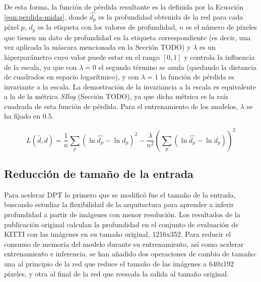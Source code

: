 De esta forma, la función de pérdida resultante es la definida por la Ecuación \ref{eqn:perdida-midas}, donde $\hat{d_p}$ es la profundidad obtenida de la red para cada píxel $p$, $d_p$ es la etiqueta con los valores de profundidad, $n$ es el número de píxeles que tienen un dato de profundidad en la etiqueta correspondiente (es decir, una vez aplicada la máscara mencionada en la Sección TODO) y $\lambda$ es un hiperparámetro cuyo valor puede estar en el rango $[0, 1]$ y controla la influencia de la escala, ya que con $\lambda=0$ el segundo término se anula (quedando la distancia de cuadrados en espacio logarítmico), y con $\lambda=1$ la función de pérdida es invariante a la escala. La demostración de la invariancia a la escala es equivalente a la de la métrica \textit{SIlog} (Sección TODO), ya que dicha métrica es la raíz cuadrada de esta función de pérdida. Para el entrenamiento de los modelos, $\lambda$ se ha fijado en $0.5$.

\begin{equation}
\label{eqn:perdida-midas}
L(\hat{d}, d) = \frac{1}{n}\sum_{p} (\ln{\hat{d_p}} - \ln{d_p})^2 - \frac{\lambda}{n^2} \left( \sum_{p} (\ln{\hat{d_p}} - \ln{d_p}) \right)^2
\end{equation}

\subsection{Reducción de tamaño de la entrada}
Para acelerar DPT lo primero que se modificó fue el tamaño de la entrada, buscando estudiar la flexibilidad de la arquitectura para aprender a inferir profundidad a partir de imágenes con menor resolución. Los resultados de la publicación original calculan la profundidad en el conjunto de evaluación de KITTI con las imágenes en su tamaño original, 1216x352. Para reducir el consumo de memoria del modelo durante su entrenamiento, así como acelerar entrenamiento e inferencia, se han añadido dos operaciones de cambio de tamaño: una al principio de la red que reduce el tamaño de las imágenes a 640x192 píxeles, y otra al final de la red que reescala la salida al tamaño original. 


